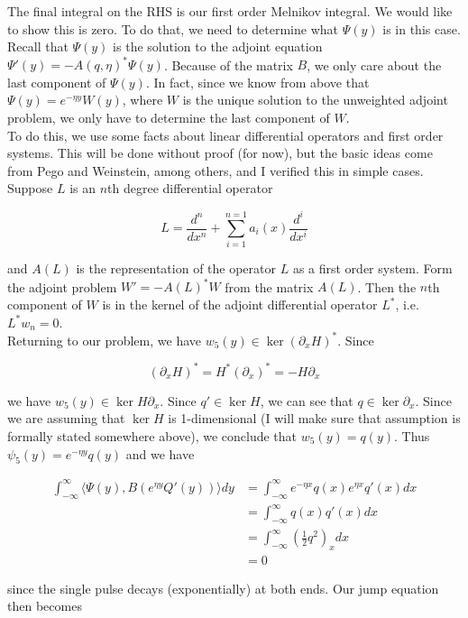 \documentclass[12pt]{article}
\begin{document}
The final integral on the RHS is our first order Melnikov integral. We would like to show this is zero. To do that, we need to determine what $\Psi(y)$ is in this case. Recall that $\Psi(y)$ is the solution to the adjoint equation $\Psi'(y) = -A(q, \eta)^*\Psi(y)$. Because of the matrix $B$, we only care about the last component of $\Psi(y)$. In fact, since we know from above that $\Psi(y) = e^{-\eta y} W(y)$, where $W$ is the unique solution to the unweighted adjoint problem, we only have to determine the last component of $W$.\\

To do this, we use some facts about linear differential operators and first order systems. This will be done without proof (for now), but the basic ideas come from Pego and Weinstein, among others, and I verified this in simple cases.\\

Suppose $L$ is an $n$th degree differential operator

\[
L = \frac{d^n}{dx^n} + \sum_{i = 1}^{n=1}a_i(x) \frac{d^i}{dx^i}
\]

and $A(L)$ is the representation of the operator $L$ as a first order system. Form the adjoint problem $W' = -A(L)^* W$ from the matrix $A(L)$. Then the $n$th component of $W$ is in the kernel of the adjoint differential operator $L^*$, i.e. $L^* w_n = 0$.\\

Returning to our problem, we have $w_5(y) \in \ker (\partial_x H)^*$. Since

\[
(\partial_x H)^* = H^* (\partial_x)^* = - H \partial_x
\]

we have $w_5(y) \in \ker H \partial_x$. Since $q' \in \ker H$, we can see that $q \in \ker \partial_x$. Since we are assuming that $\ker H$ is 1-dimensional (I will make sure that assumption is formally stated somewhere above), we conclude that $w_5(y) = q(y)$. Thus $\psi_5(y) = e^{-\eta y} q(y)$ and we have

\begin{align*}
\int_{-\infty}^\infty \langle\Psi(y), B (e^{\eta y} Q'(y)) \rangle dy &= \int_{-\infty}^\infty e^{-\eta x} q(x) e^{\eta x} q'(x) dx\\
&= \int_{-\infty}^\infty  q(x) q'(x) dx \\
&= \int_{-\infty}^\infty \left( \frac{1}{2} q^2 \right)_x dx\\
&= 0
\end{align*}

since the single pulse decays (exponentially) at both ends. Our jump equation then becomes
\end{document}
